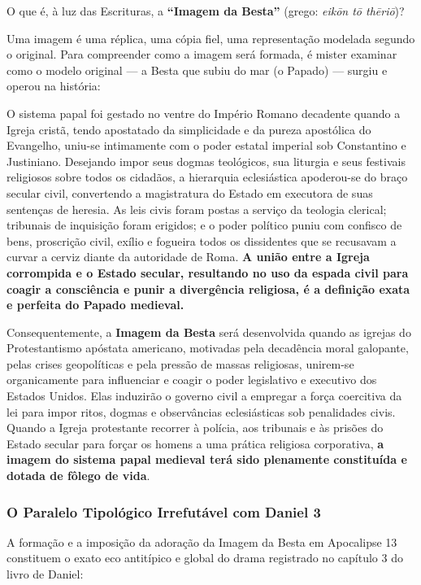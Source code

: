 \documentclass[11pt,a4paper,openany]{book}
\begin{document}
O que é, à luz das Escrituras, a \textbf{``Imagem da Besta''} (grego: \textit{eikōn tō thēriō})?

Uma imagem é uma réplica, uma cópia fiel, uma representação modelada segundo o original. Para compreender como a imagem será formada, é mister examinar como o modelo original — a Besta que subiu do mar (o Papado) — surgiu e operou na história:

O sistema papal foi gestado no ventre do Império Romano decadente quando a Igreja cristã, tendo apostatado da simplicidade e da pureza apostólica do Evangelho, uniu-se intimamente com o poder estatal imperial sob Constantino e Justiniano. Desejando impor seus dogmas teológicos, sua liturgia e seus festivais religiosos sobre todos os cidadãos, a hierarquia eclesiástica apoderou-se do braço secular civil, convertendo a magistratura do Estado em executora de suas sentenças de heresia. As leis civis foram postas a serviço da teologia clerical; tribunais de inquisição foram erigidos; e o poder político puniu com confisco de bens, proscrição civil, exílio e fogueira todos os dissidentes que se recusavam a curvar a cerviz diante da autoridade de Roma. \textbf{A união entre a Igreja corrompida e o Estado secular, resultando no uso da espada civil para coagir a consciência e punir a divergência religiosa, é a definição exata e perfeita do Papado medieval.}

Consequentemente, a \textbf{Imagem da Besta} será desenvolvida quando as igrejas do Protestantismo apóstata americano, motivadas pela decadência moral galopante, pelas crises geopolíticas e pela pressão de massas religiosas, unirem-se organicamente para influenciar e coagir o poder legislativo e executivo dos Estados Unidos. Elas induzirão o governo civil a empregar a força coercitiva da lei para impor ritos, dogmas e observâncias eclesiásticas sob penalidades civis. Quando a Igreja protestante recorrer à polícia, aos tribunais e às prisões do Estado secular para forçar os homens a uma prática religiosa corporativa, \textbf{a imagem do sistema papal medieval terá sido plenamente constituída e dotada de fôlego de vida}.


\subsubsection*{O Paralelo Tipológico Irrefutável com Daniel 3}


A formação e a imposição da adoração da Imagem da Besta em Apocalipse 13 constituem o exato eco antitípico e global do drama registrado no capítulo 3 do livro de Daniel:
\end{document}
